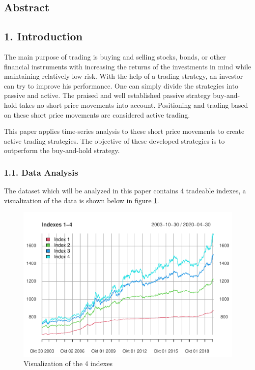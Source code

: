 \documentclass[
]{article}
\author{}
\date{\vspace{-2.5em}}
\begin{document}




\tableofcontents

\newpage

\hypertarget{abstract}{%
\subsection{Abstract}\label{abstract}}

\newpage


\hypertarget{introduction}{%
\subsection{1. Introduction}\label{introduction}}

The main purpose of trading is buying and selling stocks, bonds, or
other financial instruments with increasing the returns of the
investments in mind while maintaining relatively low risk. With the help
of a trading strategy, an investor can try to improve his performance.
One can simply divide the strategies into passive and active. The
praised and well established passive strategy buy-and-hold takes no
short price movements into account. Positioning and trading based on
these short price movements are considered active trading.

This paper applies time-series analysis to these short price movements
to create active trading strategies. The objective of these developed
strategies is to outperform the buy-and-hold strategy.

\hypertarget{data-analysis}{%
\subsubsection{1.1. Data Analysis}\label{data-analysis}}

The dataset which will be analyzed in this paper contains 4 tradeable
indexes, a visualization of the data is shown below in figure
\ref{fig:chap1.1}.

\begin{figure}

{\centering \includegraphics[width=0.7\linewidth]{00_main_files/figure-latex/chap1.1-1} 

}

\caption{Visualization of the 4 indexes}\label{fig:chap1.1}
\end{figure}
\end{document}
